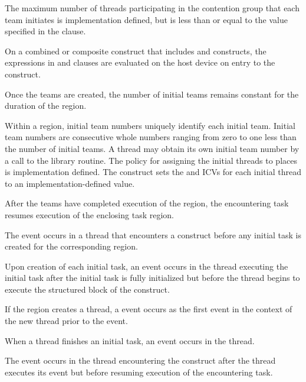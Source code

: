 The maximum number of threads participating in the contention group that 
each team initiates is implementation defined, but is less than or equal 
to the value specified in the  clause.

On a combined or composite construct that includes  and
 constructs, the expressions in  and
 clauses are evaluated on the host device on
entry to the  construct.

Once the teams are created, the number of initial teams remains constant 
for the duration of the  region.

Within a  region, initial team numbers uniquely identify each
initial team. Initial team numbers are consecutive whole numbers ranging 
from zero to one less than the number of initial teams. A thread may obtain 
its own initial team number by a call to the  library
routine. The policy for assigning the initial threads to places is 
implementation defined. The  construct sets the 
 and  ICVs for each initial 
thread to an implementation-defined value.

After the teams have completed execution of the  region, the 
encountering task resumes execution of the enclosing task region.

\events

The  event occurs in a thread that encounters a
 construct before any initial task is created for the
corresponding  region.

Upon creation of each initial task, an  event
occurs in the thread executing the initial task after the initial
task is fully initialized but before the thread begins to execute the
structured block of the  construct.

If the  region creates a thread, a 
event occurs as the first event in the context of the new thread
prior to the  event.

When a thread finishes an initial task, an 
event occurs in the thread.

The  event occurs in the thread encountering the
 construct after the thread
executes its  event
but before resuming execution of the encountering task.

